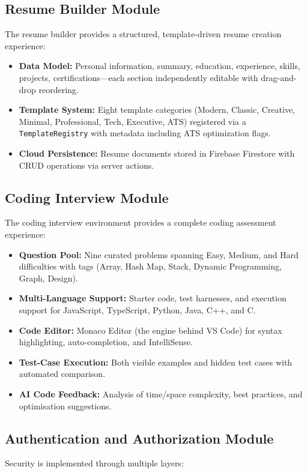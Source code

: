 \documentclass[12pt,a4paper,oneside]{report}
\begin{document}
\subsection{Resume Builder Module}
The resume builder provides a structured, template-driven resume creation experience:

\begin{itemize}
  \item \textbf{Data Model:} Personal information, summary, education, experience, skills, projects, certifications---each section independently editable with drag-and-drop reordering.
  \item \textbf{Template System:} Eight template categories (Modern, Classic, Creative, Minimal, Professional, Tech, Executive, ATS) registered via a \texttt{TemplateRegistry} with metadata including ATS optimization flags.
  \item \textbf{Cloud Persistence:} Resume documents stored in Firebase Firestore with CRUD operations via server actions.
\end{itemize}

\subsection{Coding Interview Module}
The coding interview environment provides a complete coding assessment experience:

\begin{itemize}
  \item \textbf{Question Pool:} Nine curated problems spanning Easy, Medium, and Hard difficulties with tags (Array, Hash Map, Stack, Dynamic Programming, Graph, Design).
  \item \textbf{Multi-Language Support:} Starter code, test harnesses, and execution support for JavaScript, TypeScript, Python, Java, C++, and C.
  \item \textbf{Code Editor:} Monaco Editor (the engine behind VS Code) for syntax highlighting, auto-completion, and IntelliSense.
  \item \textbf{Test-Case Execution:} Both visible examples and hidden test cases with automated comparison.
  \item \textbf{AI Code Feedback:} Analysis of time/space complexity, best practices, and optimisation suggestions.
\end{itemize}

\subsection{Authentication and Authorization Module}
Security is implemented through multiple layers:
\end{document}
